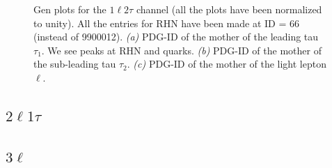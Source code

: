 \documentclass[letterpaper,12pt]{article}
\begin{document}
\vspace{0.7cm}
\begin{figure}[h]
\centering
{}%
\quad
{}%
\quad
{}%
\quad

\caption{Gen plots for the $1\ell2\tau$ channel (all the plots have been normalized to unity). All the entries for RHN have been made at ID = 66 (instead of 9900012). \emph{(a)} PDG-ID of the mother of the leading tau $\tau_{1}$. We see peaks at RHN and quarks. \emph{(b)} PDG-ID of the mother of the sub-leading tau $\tau_{2}$. \emph{(c)} PDG-ID of the mother of the light lepton $\ell$.}
\label{fig:1l2tgen}  
\end{figure}

\subsection{\Large{\boldmath$2\ell1\tau$}}
\label{sec:2l1t}

\subsection{\Large{\boldmath$3\ell$}}
\label{sec:3l}
\end{document}
